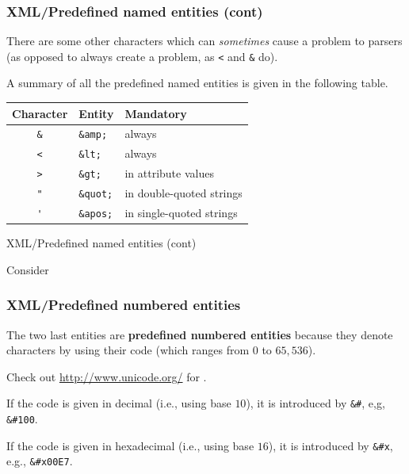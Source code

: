 %
\begin{frame}[containsverbatim]
\frametitle{XML/Predefined named entities (cont)}

There are some other characters which can \emph{sometimes} cause a
problem to \XML parsers (as opposed to always create a problem, as
\verb|<| and \verb|&| do).

\bigskip

A summary of all the predefined named entities is given in the
following table.
\begin{center}
\begin{tabular}{cll}
\toprule
Character & Entity & Mandatory\\
\midrule
\verb|&| & \verb|&amp;|  & always\\
\verb|<| & \verb|&lt;|   & always\\
\verb|>| & \verb|&gt;|   & in attribute values\\
\verb|"| & \verb|&quot;| & in double-quoted strings\\
\verb|'| & \verb|&apos;| & in single-quoted strings\\
\bottomrule
\end{tabular}
\end{center}

\end{frame}

%
\begin{frame}{XML/Predefined named entities (cont)}

Consider

\end{frame}

%
\begin{frame}[containsverbatim]
\frametitle{XML/Predefined numbered entities}

The two last entities are \textbf{predefined numbered entities} because
they denote characters by using their \Unicode code (which ranges from
\(0\) to \(65,536\)).

\bigskip

Check out \url{http://www.unicode.org/} for \Unicode.

\bigskip

If the code is given in decimal (i.e., using base \(10\)), it is
introduced by \verb|&#|, e,g, \verb|&#100|.

\bigskip

If the code is given in hexadecimal (i.e., using base \(16\)), it is
introduced by \verb|&#x|, e.g., \verb|&#x00E7|.

\end{frame}

